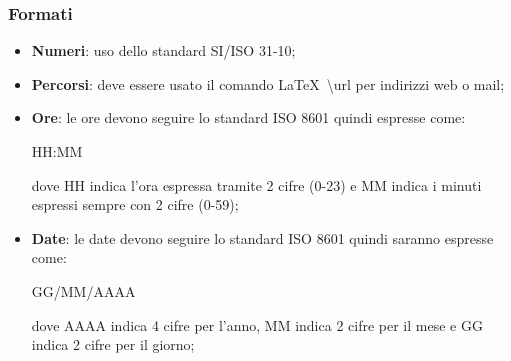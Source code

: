 \documentclass[../NormeDiProgetto.tex]{subfiles}
\begin{document}
		\subsubsection{Formati}
		\begin{itemize}
			\item \textbf{Numeri}: uso dello standard SI/ISO 31-10; 
			\item \textbf{Percorsi}: deve essere usato il comando \LaTeX\ \textbackslash url per indirizzi web  o mail;
			\item \textbf{Ore}: le ore devono seguire lo standard ISO 8601 quindi espresse come:\\
			\begin{center}
				HH:MM 
			\end{center}  
			dove HH indica l'ora espressa tramite 2 cifre (0-23) e MM indica i minuti espressi sempre con 2 cifre (0-59);
			\item \textbf{Date}: le date devono seguire lo standard ISO 8601 quindi saranno espresse come:
			\begin{center}
				GG/MM/AAAA
			\end{center}  
			dove AAAA indica 4 cifre per l'anno, MM indica 2 cifre per il mese e GG indica 2 cifre per il giorno;
		\end{itemize}
\end{document}
